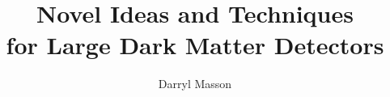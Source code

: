 \documentclass[phys,dissertation,unsrt]{puthesis}
\title{
	Novel Ideas and Techniques \\
	for Large Dark Matter Detectors%
}
\author{Darryl Masson}{Masson, Darryl}
\begin{document}
\volume















%

\appendices



%


%
\end{document}
